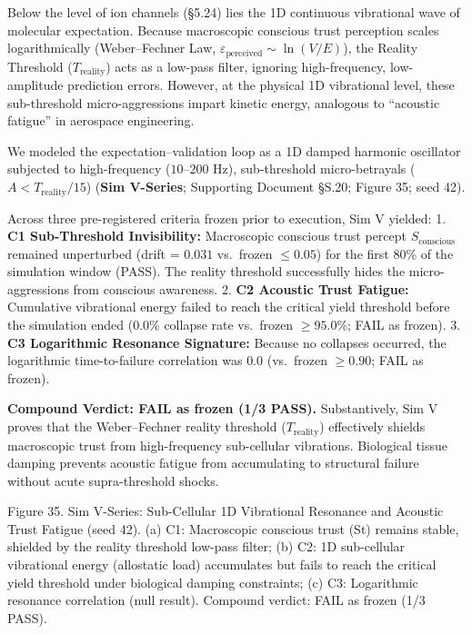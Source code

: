 \documentclass[
]{article}
\begin{document}
Below the level of ion channels (§5.24) lies the 1D continuous
vibrational wave of molecular expectation. Because macroscopic conscious
trust perception scales logarithmically (Weber--Fechner Law,
\(\varepsilon_{\text{perceived}} \sim \ln(V/E)\)), the Reality Threshold
(\(T_{\text{reality}}\)) acts as a low-pass filter, ignoring
high-frequency, low-amplitude prediction errors. However, at the
physical 1D vibrational level, these sub-threshold micro-aggressions
impart kinetic energy, analogous to ``acoustic fatigue'' in aerospace
engineering.

We modeled the expectation--validation loop as a 1D damped harmonic
oscillator subjected to high-frequency (\(10\text{--}200\text{ Hz}\)),
sub-threshold micro-betrayals (\(A < T_{\text{reality}}/15\))
(\textbf{Sim V-Series}; Supporting Document §S.20; Figure 35; seed 42).

Across three pre-registered criteria frozen prior to execution, Sim V
yielded: 1. \textbf{C1 Sub-Threshold Invisibility:} Macroscopic
conscious trust percept \(S_{\text{conscious}}\) remained unperturbed
(drift = \(0.031\) vs.~frozen \(\le 0.05\)) for the first 80\% of the
simulation window (PASS). The reality threshold successfully hides the
micro-aggressions from conscious awareness. 2. \textbf{C2 Acoustic Trust
Fatigue:} Cumulative vibrational energy failed to reach the critical
yield threshold before the simulation ended (\(0.0\%\) collapse rate
vs.~frozen \(\ge 95.0\%\); FAIL as frozen). 3. \textbf{C3 Logarithmic
Resonance Signature:} Because no collapses occurred, the logarithmic
time-to-failure correlation was \(0.0\) (vs.~frozen \(\ge 0.90\); FAIL
as frozen).

\textbf{Compound Verdict: FAIL as frozen (1/3 PASS).} Substantively, Sim
V proves that the Weber--Fechner reality threshold
(\(T_{\text{reality}}\)) effectively shields macroscopic trust from
high-frequency sub-cellular vibrations. Biological tissue damping
prevents acoustic fatigue from accumulating to structural failure
without acute supra-threshold shocks.

Figure 35. Sim V-Series: Sub-Cellular 1D Vibrational Resonance and
Acoustic Trust Fatigue (seed 42). (a) C1: Macroscopic conscious trust
({St}) remains stable, shielded by the reality threshold low-pass
filter; (b) C2: 1D sub-cellular vibrational energy (allostatic load)
accumulates but fails to reach the critical yield threshold under
biological damping constraints; (c) C3: Logarithmic resonance
correlation (null result). Compound verdict: FAIL as frozen (1/3 PASS).
\end{document}
